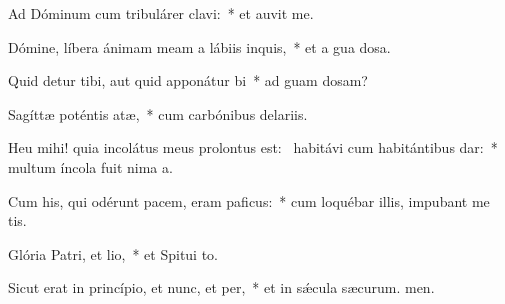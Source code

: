 \item Ad Dóminum cum tribulárer clavi:~* et auvit me.
\item Dómine, líbera ánimam meam a lábiis inquis,~* et a gua dosa.
\item Quid detur tibi, aut quid apponátur bi~* ad guam dosam?
\item Sagíttæ poténtis atæ,~* cum carbónibus delariis.
\item Heu mihi! quia incolátus meus prolontus est:~\pscross{} habitávi cum habitántibus dar:~* multum íncola fuit nima a.
\item Cum his, qui odérunt pacem, eram paficus:~* cum loquébar illis, impubant me tis.
\item Glória Patri, et lio,~* et Spitui to.
\item Sicut erat in princípio, et nunc, et per,~* et in sǽcula sæcurum. men.
